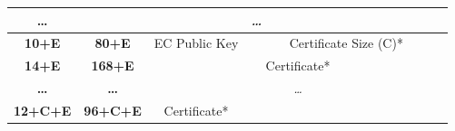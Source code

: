 \begin{table}[H]
{\begin{tabular}{|ccccccccccccccccccclllllllclllllll}
      \multicolumn{1}{c|}{\textbf{…}} &
      \multicolumn{32}{c|}{\cellcolor[HTML]{FFDDDD}\textit{…}} \\ \hline
    \multicolumn{1}{|c|}{\textbf{10+E}} &
      \multicolumn{1}{c|}{\textbf{80+E}} &
      \multicolumn{16}{c|}{\cellcolor[HTML]{FFDDDD}EC   Public Key} &
      \multicolumn{16}{c|}{\cellcolor[HTML]{FFF8DD}Certificate   Size (C)*} \\ \hline
    \multicolumn{1}{|c|}{\textbf{14+E}} &
      \multicolumn{1}{c|}{\textbf{168+E}} &
      \multicolumn{32}{c|}{\cellcolor[HTML]{FFF8DD}Certificate*} \\ \hline
    \multicolumn{1}{|c|}{\textbf{…}} &
      \multicolumn{1}{c|}{\textbf{…}} &
      \multicolumn{32}{c|}{\cellcolor[HTML]{FFF8DD}\textit{…}} \\ \hline
    \multicolumn{1}{|c|}{\textbf{12+C+E}} &
      \multicolumn{1}{c|}{\textbf{96+C+E}} &
      \multicolumn{16}{c|}{\cellcolor[HTML]{FFF8DD}Certificate*} &
      \multicolumn{1}{l}{} &
       &
       &
       &
       &
       &
       &
       &
      \multicolumn{1}{l}{} &
       &
       &
       &
       &
       &
       &
       \\ \cline{1-18}
    \end{tabular}%
    }
\end{table}